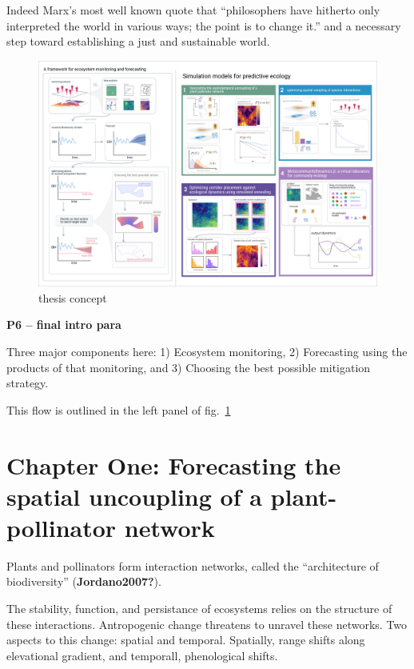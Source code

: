 \documentclass[11pt]{article}
\makeatletter
\def\maxwidth{\ifdim\Gin@nat@width>\linewidth\linewidth
\else\Gin@nat@width\fi}
\let\Oldincludegraphics\includegraphics
\renewcommand{\includegraphics}[1]{\Oldincludegraphics[width=\maxwidth]{#1}}
\makeatother
\begin{document}
Indeed Marx's most well known quote that ``philosophers have hitherto
only interpreted the world in various ways; the point is to change it.''
and a necessary step toward establishing a just and sustainable world.

\begin{figure}
\hypertarget{fig:thesis}{%
\centering
\includegraphics{./figures/thesisconcept.png}
\caption{thesis concept}\label{fig:thesis}
}
\end{figure}

\textbf{P6 -- final intro para}

Three major components here: 1) Ecosystem monitoring, 2) Forecasting
using the products of that monitoring, and 3) Choosing the best possible
mitigation strategy.

This flow is outlined in the left panel of fig.~\ref{fig:thesis}

\hypertarget{chapter-one-forecasting-the-spatial-uncoupling-of-a-plant-pollinator-network}{%
\section{Chapter One: Forecasting the spatial uncoupling of a
plant-pollinator
network}\label{chapter-one-forecasting-the-spatial-uncoupling-of-a-plant-pollinator-network}}

Plants and pollinators form interaction networks, called the
``architecture of biodiversity'' (\textbf{Jordano2007?}).

The stability, function, and persistance of ecosystems relies on the
structure of these interactions. Antropogenic change threatens to
unravel these networks. Two aspects to this change: spatial and
temporal. Spatially, range shifts along elevational gradient, and
temporall, phenological shifts.
\end{document}
